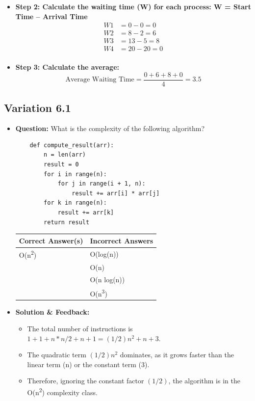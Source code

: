 \begin{itemize}
\begin{itemize}
        \item \textbf{Step 2: Calculate the waiting time (W) for each process: W = Start Time – Arrival Time}
        \begin{align*}
            W1 &= 0 - 0 = 0 \\
            W2 &= 8 - 2 = 6 \\
            W3 &= 13 - 5 = 8 \\
            W4 &= 20 - 20 = 0 \\
        \end{align*}
        
        \item \textbf{Step 3: Calculate the average:}
        \[
            \text{Average Waiting Time} = \frac{0 + 6 + 8 + 0}{4} = 3.5
        \]
    \end{itemize}
\end{itemize}

\subsection{Variation 6.1}
\begin{itemize}
    \item \textbf{Question:} What is the complexity of the following algorithm?
    
    \begin{lstlisting}
    def compute_result(arr):
        n = len(arr)
        result = 0
        for i in range(n):
            for j in range(i + 1, n):
                result += arr[i] * arr[j]
        for k in range(n):
            result += arr[k]
        return result
    \end{lstlisting}
    
    \begin{tabular}{|l|l|}
        \hline
        \textbf{Correct Answer(s)} & \textbf{Incorrect Answers} \\
        \hline
        O(n\textsuperscript{2}) & O(log(n)) \\
         & O(n) \\
         & O(n log(n)) \\
         & O(n\textsuperscript{3}) \\
        \hline
    \end{tabular}
    
    \item \textbf{Solution \& Feedback:}
    \begin{itemize}
        \item The total number of instructions is \( 1 + 1 + n * n/2 + n + 1 = (1/2)n^2 + n + 3 \).
        \item The quadratic term \((1/2)n^2\) dominates, as it grows faster than the linear term (n) or the constant term (3).
        \item Therefore, ignoring the constant factor \((1/2)\), the algorithm is in the O(n\textsuperscript{2}) complexity class.
    \end{itemize}
\end{itemize}

